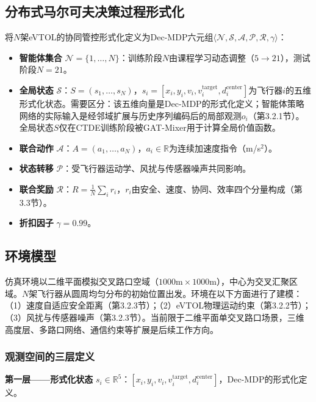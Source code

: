 \documentclass[12pt,a4paper,UTF8]{ctexart}
\begin{document}
\subsection{分布式马尔可夫决策过程形式化}

将$N$架eVTOL的协同管控形式化定义为Dec-MDP六元组$\langle \mathcal{N}, \mathcal{S}, \mathcal{A}, \mathcal{P}, \mathcal{R}, \gamma \rangle$：

\begin{itemize}
    \item \textbf{智能体集合} $\mathcal{N} = \{1, \ldots, N\}$：训练阶段$N$由课程学习动态调整（$5 \to 21$），测试阶段$N=21$。
    \item \textbf{全局状态} $\mathcal{S}$：$S = (s_1, \ldots, s_N)$，$s_i = [x_i, y_i, v_i, v_i^{\text{target}}, d_i^{\text{center}}]$为飞行器$i$的五维形式化状态。需要区分：该五维向量是Dec-MDP的形式化定义；智能体策略网络的实际输入是经邻域扩展与历史序列编码后的局部观测$o_i$（第3.2.1节）。全局状态$S$仅在CTDE训练阶段被GAT-Mixer用于计算全局价值函数。
    \item \textbf{联合动作} $\mathcal{A}$：$A = (a_1, \ldots, a_N)$，$a_i \in \mathbb{R}$为连续加速度指令（m/s$^2$）。
    \item \textbf{状态转移} $\mathcal{P}$：受飞行器运动学、风扰与传感器噪声共同影响。
    \item \textbf{联合奖励} $\mathcal{R}$：$R = \frac{1}{N}\sum_i r_i$，$r_i$由安全、速度、协同、效率四个分量构成（第3.3节）。
    \item \textbf{折扣因子} $\gamma = 0.99$。
\end{itemize}

\subsection{环境模型}

仿真环境以二维平面模拟交叉路口空域（$1000\text{m} \times 1000\text{m}$），中心为交叉汇聚区域。$N$架飞行器从圆周均匀分布的初始位置出发。环境在以下方面进行了建模：（1）速度自适应安全距离（第3.2.3节）；（2）eVTOL物理运动约束（第3.2.2节）；（3）风扰与传感器噪声（第3.2.3节）。当前限于二维平面单交叉路口场景，三维高度层、多路口网络、通信约束等扩展是后续工作方向。

\subsubsection{观测空间的三层定义}

\textbf{第一层——形式化状态} $s_i \in \mathbb{R}^5$：$[x_i, y_i, v_i, v_i^{\text{target}}, d_i^{\text{center}}]$，Dec-MDP的形式化定义。
\end{document}
